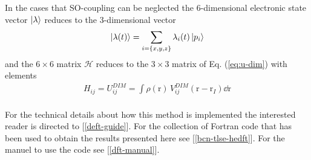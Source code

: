 \documentclass[12pt,a4paper,twosides]{book}
\renewcommand{\vec}[1]{\bm{\mathrm{#1}}}
\begin{document}
			In the cases that SO-coupling can be neglected the 6-dimensional electronic state vector $\ket{\lambda}$ reduces to the 3-dimensional vector
			\begin{align}
				\ket{\lambda(t)} = \sum_{i=\{x,y,z\}} \lambda_{i}(t) \ket{p_i}
			\end{align}
			and the $6\times6$ matrix $\mathcal{H}$ reduces to the $3\times 3$ matrix of Eq. (\ref{eq:u-dim}) with elements
			\begin{align}
				H_{ij} = U^{DIM}_{ij} = \int\!\rho(\vec{r})\,V^{DIM}_{ij}(\vec{r}-\vec{r}_I)\dd{\vec{r}}
			\end{align}\\
			
			For the technical details about how this method is implemented the interested reader is directed to [\ref{deft-guide}]. For the collection of Fortran code that has been used to obtain the results presented here see [\ref{bcn-tlse-hedft}]. For the manuel to use the code see [\ref{dft-manual}].





\end{document}
